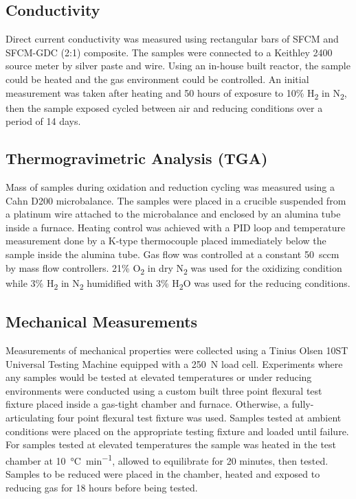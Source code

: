     \subsection{Conductivity}
        Direct current conductivity was measured using rectangular bars of SFCM and SFCM-GDC (2:1) composite.
        The samples were connected to a Keithley 2400 source meter by silver paste and wire.
        Using an in-house built reactor, the sample could be heated and the gas environment could be controlled.
        An initial measurement was taken after heating and 50 hours of exposure to 10\% H\textsubscript{2} in N\textsubscript{2}, then the sample exposed cycled between air and reducing conditions over a period of 14 days.

    \subsection{Thermogravimetric Analysis (TGA)}
        Mass of samples during oxidation and reduction cycling was measured using a Cahn D200 microbalance.
        The samples were placed in a crucible suspended from a platinum wire attached to the microbalance and enclosed by an alumina tube inside a furnace.
        Heating control was achieved with a PID loop and temperature measurement done by a K-type thermocouple placed immediately below the sample inside the alumina tube.
        Gas flow was controlled at a constant \SI{50}{sccm} by mass flow controllers.
        21\% O\textsubscript{2} in dry N\textsubscript{2} was used for the oxidizing condition while 3\% H\textsubscript{2} in N\textsubscript{2} humidified with 3\% H\textsubscript{2}O was used for the reducing conditions.

    \subsection{Mechanical Measurements}
        Measurements of mechanical properties were collected using a Tinius Olsen 10ST Universal Testing Machine equipped with a \SI{250}{N} load cell.
        Experiments where any samples would be tested at elevated temperatures or under reducing environments were conducted using a custom built three point flexural test fixture placed inside a gas-tight chamber and furnace.
        Otherwise, a fully-articulating four point flexural test fixture was used.
        Samples tested at ambient conditions were placed on the appropriate testing fixture and loaded until failure.
        For samples tested at elevated temperatures the sample was heated in the test chamber at \SI{10}{\celsius\per\minute}, allowed to equilibrate for 20 minutes, then tested.
        Samples to be reduced were placed in the chamber, heated and exposed to reducing gas for 18 hours before being tested.

